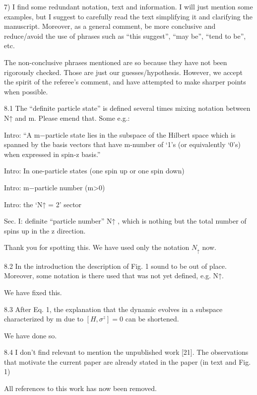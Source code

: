 \documentclass[english]{letter}
\begin{document}
\begin{shaded}
7) I find some redundant notation, text and information. I will just
mention some examples, but I suggest to carefully read the text
simplifying it and clarifying the manuscript. Moreover, as a general
comment, be more conclusive and reduce/avoid the use of phrases such
as “this suggest”, “may be”, “tend to be”, etc.
\end{shaded}
\noindent
The non-conclusive phrases mentioned are so because they have not been rigorously checked. Those are just our guesses/hypothesis.
However, we accept the spirit of the referee's comment, and have attempted to make sharper points when possible.
\begin{shaded}
8.1 The “definite particle state” is defined several times mixing
notation between N↑ and m. Please emend that. Some e.g.:

Intro: “A m−particle state lies in the subspace of the Hilbert space
which is spanned by the basis vectors that have m-number of ‘1’s (or
equivalently ‘0’s) when expressed in spin-z basis.”

Intro: In one-particle states (one spin up or one spin down)

Intro: m−particle number (m>0)

Intro: the ‘N↑ = 2’ sector

Sec. I: definite “particle number” N↑ , which is nothing but the total
number of spins up in the z direction.
\end{shaded}
\noindent Thank you for spotting this. We have used only the notation $N_{\uparrow}$ now.

\begin{shaded}
8.2 In the introduction the description of Fig. 1 sound to be out of
place. Moreover, some notation is there used that was not yet defined,
e.g. N↑.
\end{shaded}
\noindent We have fixed this. 

\begin{shaded}
8.3 After Eq. 1, the explanation that the dynamic evolves in a
subspace characterized by m due to $[H,\sigma^z] =0$ can be shortened.
\end{shaded}
\noindent We have done so.

\begin{shaded}
8.4 I don't find relevant to mention the unpublished work [21]. The
observations that motivate the current paper are already stated in the
paper (in text and Fig. 1)
\end{shaded}
\noindent All references to this work has now been removed.
\end{document}
